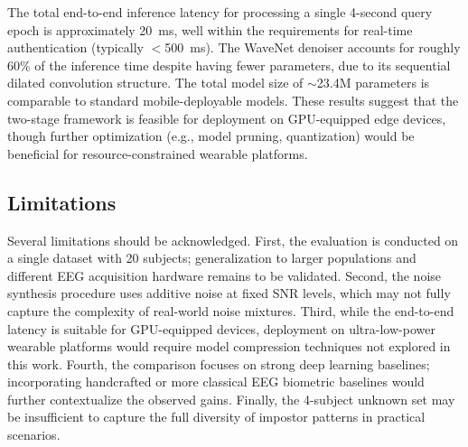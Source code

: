 \documentclass[a4paper,conference]{IEEEtran}
\begin{document}
	The total end-to-end inference latency for processing a single 4-second query epoch is approximately 20~ms, well within the requirements for real-time authentication (typically $<$500~ms). The WaveNet denoiser accounts for roughly 60\% of the inference time despite having fewer parameters, due to its sequential dilated convolution structure. The total model size of $\sim$23.4M parameters is comparable to standard mobile-deployable models. These results suggest that the two-stage framework is feasible for deployment on GPU-equipped edge devices, though further optimization (e.g., model pruning, quantization) would be beneficial for resource-constrained wearable platforms.

	\subsection{Limitations}
	Several limitations should be acknowledged. First, the evaluation is conducted on a single dataset with 20 subjects; generalization to larger populations and different EEG acquisition hardware remains to be validated. Second, the noise synthesis procedure uses additive noise at fixed SNR levels, which may not fully capture the complexity of real-world noise mixtures. Third, while the end-to-end latency is suitable for GPU-equipped devices, deployment on ultra-low-power wearable platforms would require model compression techniques not explored in this work. Fourth, the comparison focuses on strong deep learning baselines; incorporating handcrafted or more classical EEG biometric baselines would further contextualize the observed gains. Finally, the 4-subject unknown set may be insufficient to capture the full diversity of impostor patterns in practical scenarios.
	
	
\end{document}
